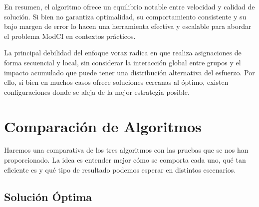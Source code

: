 \documentclass[11pt,letter]{article}
\begin{document}
    En resumen, el algoritmo ofrece un equilibrio notable entre velocidad y calidad de solución. Si bien no garantiza optimalidad, su comportamiento consistente y su bajo margen de error lo hacen una herramienta efectiva y escalable para abordar el problema ModCI en contextos prácticos.
    \begin{tcolorbox}[colback=red!5!white, colframe=red!50!black, title=Advertencia sobre la correctitud]
            La principal debilidad del enfoque voraz radica en que realiza asignaciones de forma secuencial y local, sin considerar la interacción global entre grupos y el impacto acumulado que puede tener una distribución alternativa del esfuerzo. Por ello, si bien en muchos casos ofrece soluciones cercanas al óptimo, existen configuraciones donde se aleja de la mejor estrategia posible. 
        \end{tcolorbox}


    \newpage



    \section{Comparación de Algoritmos}

    Haremos una comparativa de los tres algoritmos con las pruebas que se nos han proporcionado. La idea es entender mejor cómo se comporta cada uno, qué tan eficiente es y qué tipo de resultado podemos esperar en distintos escenarios.

    \subsection{Solución Óptima}
\end{document}
